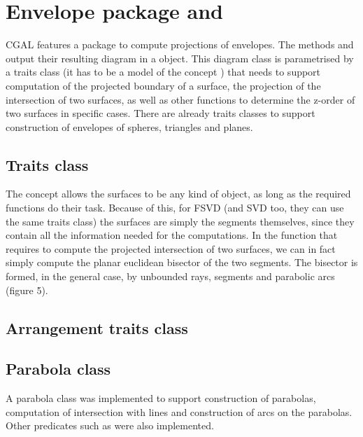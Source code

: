 \documentclass[11pt,a4paper,english]{article}
\begin{document}

	\section{Envelope package and }
	CGAL features a package to compute projections of envelopes. The methods  and  output their resulting diagram in a  object.
	This diagram class is parametrised by a traits class (it has to be a model of the concept ) that needs to support computation of the projected boundary of a surface, the projection of the intersection of two surfaces, as well as other functions to determine the z-order of two surfaces in specific cases.
	There are already traits classes to support construction of envelopes of spheres, triangles and planes.
	
	\subsection{Traits class}
	The  concept allows the surfaces to be any kind of object, as long as the required functions do their task. Because of this, for FSVD (and SVD too, they can use the same traits class) the surfaces are simply the segments themselves, since they contain all the information needed for the computations.
	In the function that requires to compute the projected intersection of two surfaces, we can in fact simply compute the planar euclidean bisector of the two segments.
	The bisector is formed, in the general case, by unbounded rays, segments and parabolic arcs (figure 5).
	
	\subsection{Arrangement traits class}

	\subsection{Parabola class}
	A parabola class was implemented to support construction of parabolas, computation of intersection with lines and construction of arcs on the parabolas. Other predicates such as  were also implemented.
	
\end{document}
